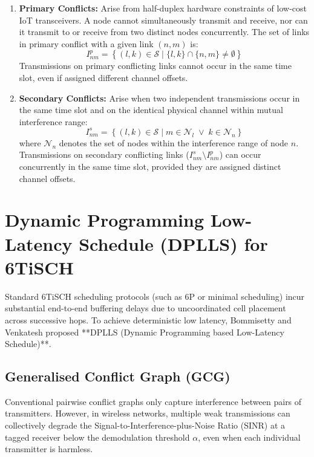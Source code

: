 \begin{enumerate}
    \item \textbf{Primary Conflicts:} Arise from half-duplex hardware constraints of low-cost IoT transceivers. A node cannot simultaneously transmit and receive, nor can it transmit to or receive from two distinct nodes concurrently. The set of links in primary conflict with a given link $(n, m)$ is:
    \begin{equation}
        I_{nm}^p = \left\{ (l, k) \in \mathcal{S} \;\Big|\; \{l, k\} \cap \{n, m\} \ne \emptyset \right\}
    \end{equation}
    Transmissions on primary conflicting links cannot occur in the same time slot, even if assigned different channel offsets.
    \item \textbf{Secondary Conflicts:} Arise when two independent transmissions occur in the same time slot and on the identical physical channel within mutual interference range:
    \begin{equation}
        I_{nm}^s = \left\{ (l, k) \in \mathcal{S} \;\Big|\; m \in \mathcal{N}_l \;\lor\; k \in \mathcal{N}_n \right\}
    \end{equation}
    where $\mathcal{N}_n$ denotes the set of nodes within the interference range of node $n$. Transmissions on secondary conflicting links ($I_{nm}^s \setminus I_{nm}^p$) can occur concurrently in the same time slot, provided they are assigned distinct channel offsets.
\end{enumerate}

\section{Dynamic Programming Low-Latency Schedule (DPLLS) for 6TiSCH}
\label{sec:dplls}

Standard 6TiSCH scheduling protocols (such as 6P or minimal scheduling) incur substantial end-to-end buffering delays due to uncoordinated cell placement across successive hops. To achieve deterministic low latency, Bommisetty and Venkatesh \cite{bommisetty2022dplls} proposed **DPLLS (Dynamic Programming based Low-Latency Schedule)**.

\subsection{Generalised Conflict Graph (GCG)}
Conventional pairwise conflict graphs only capture interference between pairs of transmitters. However, in wireless networks, multiple weak transmissions can collectively degrade the Signal-to-Interference-plus-Noise Ratio (SINR) at a tagged receiver below the demodulation threshold $\alpha$, even when each individual transmitter is harmless.

